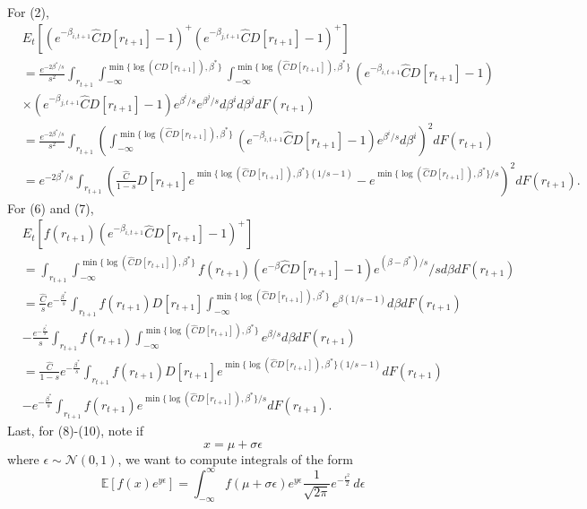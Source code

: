 For (2),
\begin{align*}
&E_t[(e^{-\beta_{i, t+1}} \hat C D[r_{t+1}] - 1)^+(e^{-\beta_{j, t+1}} \hat C D[r_{t+1}] - 1)^+ ] \\
&= \frac{e^{-2 \beta^*/s}}{s^2}\int_{r_{t+1}} \int_{-\infty}^{\min\{\log (\hat C D[r_{t+1}]), \beta^* \}} \int_{-\infty}^{\min\{\log (\hat C D[r_{t+1}]), \beta^* \}}(e^{-\beta_{i, t+1}} \hat C D[r_{t+1}] - 1) \\
&\times (e^{-\beta_{j, t+1}} \hat C D[r_{t+1}] - 1) e^{\beta^i / s}  e^{\beta^j / s} d \beta^i d \beta^j d F (r_{t+1}) \\
&=\frac{e^{-2 \beta^*/s}}{s^2}\int_{r_{t+1}} \left(\int_{-\infty}^{\min\{\log (\hat C D[r_{t+1}]), \beta^* \}} (e^{-\beta_{i, t+1}} \hat C D[r_{t+1}] - 1) e^{\beta^i / s} d \beta^i\right)^2 d F (r_{t+1}) \\
&=e^{-2 \beta^*/s}\int_{r_{t+1}}(\frac{\hat C}{1-s}D[r_{t+1}] e^{\min\{\log (\hat C D[r_{t+1}]), \beta^* \}  (1/ s - 1)} -  e^{\min\{\log (\hat C D[r_{t+1}]), \beta^* \}/ s})^2 d F (r_{t+1}).
\end{align*}
For (6) and (7), 
\begin{align*}
&E_t[f(r_{t+1}) (e^{-\beta_{i, t+1}} \hat C D[r_{t+1}] - 1)^+] \\
&= \int_{r_{t+1}} \int_{-\infty}^{\min\{\log (\hat C D[r_{t+1}]), \beta^* \}}f(r_{t+1})(e^{-\beta} \hat C D[r_{t+1}] - 1) e^{(\beta - \beta^*) / s} / s d \beta d F (r_{t+1}) \\
&= \frac{\hat C}{s} e^{-\frac{\beta^*}{s}}\int_{r_{t+1}}f(r_{t+1}) D[r_{t+1}] \int_{-\infty}^{\min\{\log (\hat C D[r_{t+1}]), \beta^* \}} e^{\beta  (1/ s - 1)}  d \beta d F (r_{t+1})\\
&- \frac{ e^{-\frac{\beta^*}{s}}}{s}\int_{r_{t+1}} f(r_{t+1})\int_{-\infty}^{\min\{\log (\hat C D[r_{t+1}]), \beta^* \}} e^{\beta/ s} d \beta d F (r_{t+1}) \\
&= \frac{\hat C}{1-s} e^{-\frac{\beta^*}{s}}\int_{r_{t+1}}f(r_{t+1}) D[r_{t+1}] e^{\min\{\log (\hat C D[r_{t+1}]), \beta^* \}  (1/ s - 1)}  d F(r_{t+1})\\
& -  e^{-\frac{\beta^*}{s}}\int_{r_{t+1}} f(r_{t+1}) e^{\min\{\log (\hat C D[r_{t+1}]), \beta^* \}/ s}  d F (r_{t+1}).
\end{align*}
Last, for (8)-(10), note if
\begin{equation*}
x = \mu + \sigma \epsilon
\end{equation*}
where $\epsilon \sim \mathcal{N}(0, 1)$, we want to compute integrals of the form
\begin{equation*}
\mathbb{E}[f(x) e^{y \epsilon}] = \int_{-\infty}^{\infty} f(\mu + \sigma \epsilon) e^{y \epsilon} \frac{1}{\sqrt{2\pi}} e^{-\frac{\epsilon^2}{2}} \, d\epsilon
\end{equation*}
